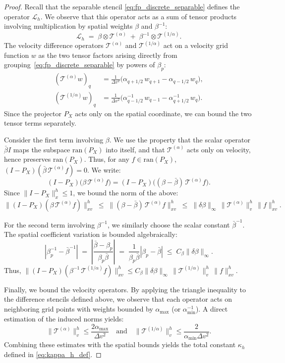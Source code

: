 \documentclass[]{article}
\numberwithin{equation}{section}
\begin{document}
\begin{proof}
Recall that the separable stencil \eqref{eq:fp_discrete_separable} defines the operator $\mathcal{L}_{h}$. We observe that this operator acts as a sum of tensor products involving multiplication by spatial weights $\beta$ and $\beta^{-1}$:
\[
  \mathcal{L}_{h} \;=\; \beta \otimes \mathcal{T}^{(\alpha)} \;+\; \beta^{-1} \otimes \mathcal{T}^{(1/\alpha)}.
\]
The velocity difference operators $\mathcal{T}^{(\alpha)}$ and $\mathcal{T}^{(1/\alpha)}$ act on a velocity grid function $w$ as the two tensor factors arising directly from grouping~\eqref{eq:fp_discrete_separable} by powers of $\beta_p$:
\begin{align*}
    (\mathcal{T}^{(\alpha)} w)_q &= \frac{1}{\Delta v^2}\big(\alpha_{q+1/2}\,w_{q+1} - \alpha_{q-1/2}\,w_q\big), \\
    (\mathcal{T}^{(1/\alpha)} w)_q &= \frac{1}{\Delta v^2}\big(\alpha_{q-1/2}^{-1}\,w_{q-1} - \alpha_{q+1/2}^{-1}\,w_q\big).
\end{align*}
Since the projector $P_X$ acts only on the spatial coordinate, we can bound the two tensor terms separately.

Consider the first term involving $\beta$. We use the property that the scalar operator $\bar{\beta}I$ maps the subspace $\mathrm{ran}(P_X)$ into itself, and that $\mathcal{T}^{(\alpha)}$ acts only on velocity, hence preserves $\mathrm{ran}(P_X)$. Thus, for any $f \in \mathrm{ran}(P_X)$, $(I-P_X)(\bar{\beta}\,\mathcal{T}^{(\alpha)}f) = 0$. We write:
\[
  (I-P_X)\big(\beta\,\mathcal{T}^{(\alpha)}f\big) = (I-P_X)\big((\beta - \bar{\beta})\,\mathcal{T}^{(\alpha)}f\big).
\]
Since $\|I-P_X\|_{x}^{h} \le 1$, we bound the norm of the above:
\[
  \|(I-P_X)(\beta\,\mathcal{T}^{(\alpha)}f)\|_{xv}^h \;\le\; \|(\beta - \bar{\beta})\,\mathcal{T}^{(\alpha)}f\|_{xv}^h \;\le\; \|\delta \beta\|_\infty \,\|\mathcal{T}^{(\alpha)}\|_v^h\, \|f\|_{xv}^h.
\]

For the second term involving $\beta^{-1}$, we similarly choose the scalar constant $\bar{\beta}^{-1}$. The spatial coefficient variation is bounded algebraically:
\[
  |\beta_p^{-1} - \bar{\beta}^{-1}| \;=\; \left| \frac{\bar{\beta} - \beta_p}{\beta_p \bar{\beta}} \right| \;=\; \frac{1}{\beta_p \bar{\beta}} |\beta_p - \bar{\beta}| \;\le\; C_\beta \|\delta \beta\|_\infty.
\]
Thus, $\|(I-P_X)(\beta^{-1}\,\mathcal{T}^{(1/\alpha)}f)\|_{xv}^h \le C_\beta \|\delta \beta\|_\infty\,\|\mathcal{T}^{(1/\alpha)}\|_v^h\, \|f\|_{xv}^h$.

Finally, we bound the velocity operators. By applying the triangle inequality to the difference stencils defined above, we observe that each operator acts on neighboring grid points with weights bounded by $\alpha_{\max}$ (or $\alpha_{\min}^{-1}$). A direct estimation of the induced norms yields:
\[
  \|\mathcal{T}^{(\alpha)}\|_v^h \le \frac{2\alpha_{\max}}{\Delta v^2} \quad \text{and} \quad \|\mathcal{T}^{(1/\alpha)}\|_v^h \le \frac{2}{\alpha_{\min}\Delta v^2}.
\]
Combining these estimates with the spatial bounds yields the total constant $\kappa_h$ defined in \eqref{eq:kappa_h_def}.
\end{proof}
\end{document}

